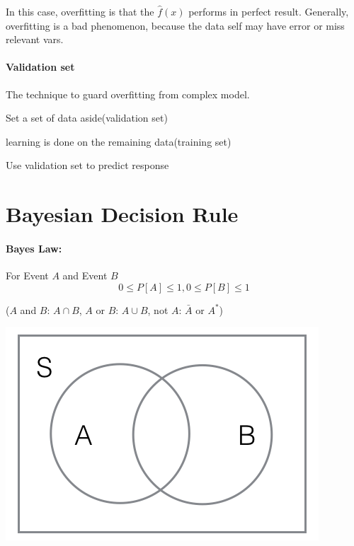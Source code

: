 \documentclass{article}
\begin{document}
{{{{            In this case, overfitting is that the $\hat{f}(x)$ performs in perfect result. Generally, overfitting is a bad phenomenon, because the data self may have error or miss relevant vars.

            \paragraph{Validation set}{
                The technique to guard overfitting from complex model.\\
                \begin{enumerate}{
                    \item Set a set of data aside(validation set)
                    \item learning is done on the remaining data(training set)
                    \item Use validation set to predict response
                }
                \end{enumerate}
            }
        }
    }
}

\section{Bayesian Decision Rule}{
    \paragraph{Bayes Law:}{
        For Event $A$ and Event $B$
        \[0 \le P[A] \le 1, 0 \le P[B] \le 1 \]

        \begin{center}{
            ($A$ and $B$: $A \cap B$, $A$ or $B$: $A \cup B$, not $A$: $\bar{A}$ or $A^*$)
        }
        \end{center}

        \begin{center}{
            \includegraphics[scale=0.5]{bayes.png}
        }
        \end{center}

}}}
\end{document}

